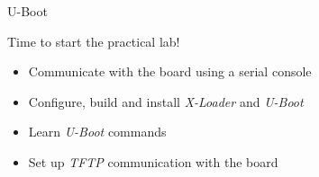 \setuplabframe
{U-Boot}
{
  Time to start the practical lab!
  \begin{itemize}
  \item Communicate with the board using a serial console
  \item Configure, build and install {\em X-Loader} and {\em U-Boot}
  \item Learn {\em U-Boot} commands
  \item Set up {\em TFTP} communication with the board
  \end{itemize}
}
